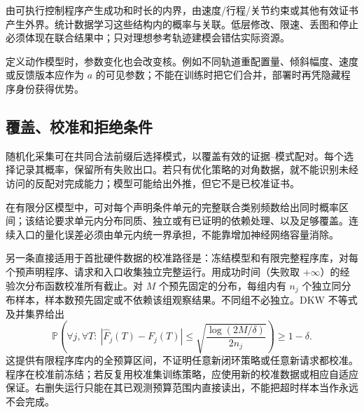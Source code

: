 \documentclass[11pt,a4paper,fontset=fandol]{ctexart}
\theoremstyle{definition}
\theoremstyle{remark}
\numberwithin{equation}{section}
\newcommand{\Pp}{\mathbb P}
\begin{document}
由可执行控制程序产生成功和时长的内界，由速度/行程/关节约束或其他有效证书产生外界。统计数据学习这些结构内的概率与关联。低层修改、限速、丢图和停止必须体现在联合结果中；只对理想参考轨迹建模会错估实际资源。

定义动作模型时，参数变化也会改变核。例如不同轨道重配置量、倾斜幅度、速度或反馈版本应作为 $a$ 的可见参数；不能在训练时把它们合并，部署时再凭隐藏程序身份获得优势。

\subsection{覆盖、校准和拒绝条件}
随机化采集可在共同合法前缀后选择模式，以覆盖有效的证据--模式配对。每个选择记录其概率，保留所有失败出口。若只有优化策略的对角数据，就不能识别未经访问的反配对完成能力；模型可能给出外推，但它不是已校准证书。

在有限分区模型中，可对每个声明条件单元的完整联合类别频数给出同时概率区间；该结论要求单元内分布同质、独立或有已证明的依赖处理、以及足够覆盖。连续入口的量化误差必须由单元内统一界承担，不能靠增加神经网络容量消除。

另一条直接适用于首批硬件数据的校准路径是：冻结模型和有限完整程序库，对每个预声明程序、请求和入口收集独立完整运行。用成功时间（失败取 $+\infty$）的经验次分布函数校准所有截止。对 $M$ 个预先固定的分布，每组内有 $n_j$ 个独立同分布样本，样本数预先固定或不依赖该组观察结果。不同组不必独立。DKW 不等式及并集界给出\cite{massart}
\begin{equation}
 \Pp\!\left(
 \forall j,\forall T:\ 
 |\widehat F_j(T)-F_j(T)|
 \le\sqrt{\frac{\log(2M/\delta)}{2n_j}}
 \right)\ge1-\delta.
 \label{eq:dkw}
\end{equation}
这提供有限程序库内的全预算区间，不证明任意新闭环策略或任意新请求都校准。程序在校准前冻结；若反复用校准集训练策略，应使用新的校准数据或相应自适应保证。右删失运行只能在其已观测预算范围内直接读出，不能把超时样本当作永远不会完成。
\end{document}
